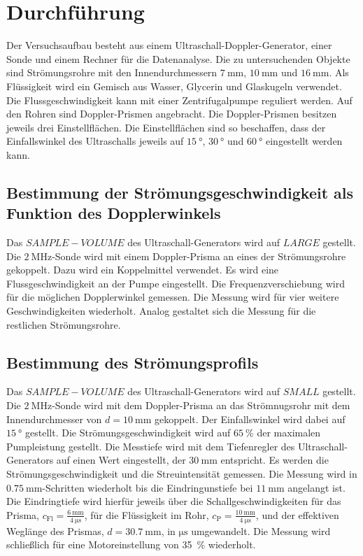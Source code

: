 \section{Durchführung}
\label{sec:Durchführung}
Der Versuchsaufbau besteht aus einem Ultraschall-Doppler-Generator, einer Sonde und einem Rechner für die Datenanalyse.
Die zu untersuchenden Objekte sind Strömungsrohre mit den Innendurchmessern $\SI{7}{\milli\meter}$, $\SI{10}{\milli\meter}$ und $\SI{16}{\milli\meter}$.
Als Flüssigkeit wird ein Gemisch aus Wasser, Glycerin und Glaskugeln verwendet.
Die Flussgeschwindigkeit kann mit einer Zentrifugalpumpe reguliert werden.
Auf den Rohren sind Doppler-Prismen angebracht.
Die Doppler-Prismen besitzen jeweils drei Einstellflächen.
Die Einstellflächen sind so beschaffen, dass der Einfallswinkel des Ultraschalls jeweils auf $\SI{15}{\degree}$, $\SI{30}{\degree}$ und $\SI{60}{\degree}$ eingestellt werden kann.
\subsection{Bestimmung der Strömungsgeschwindigkeit als Funktion des Dopplerwinkels}
Das $SAMPLE-VOLUME$ des Ultraschall-Generators wird auf $LARGE$ gestellt.
Die $\SI{2}{\mega\hertz}$-Sonde wird mit einem Doppler-Prisma an eines der Strömungsrohre gekoppelt.
Dazu wird ein Koppelmittel verwendet.
Es wird eine Flussgeschwindigkeit an der Pumpe eingestellt.
Die Frequenzverschiebung wird für die möglichen Dopplerwinkel gemessen.
Die Messung wird für vier weitere Geschwindigkeiten wiederholt.
Analog gestaltet sich die Messung für die restlichen Strömungsrohre.
\subsection{Bestimmung des Strömungsprofils}
Das $SAMPLE-VOLUME$ des Ultraschall-Generators wird auf $SMALL$ gestellt.
Die $\SI{2}{\mega\hertz}$-Sonde wird mit dem Doppler-Prisma an das Strömnugsrohr mit dem Innendurchmesser von $d= \SI{10}{\milli\meter}$ gekoppelt.
Der Einfallswinkel wird dabei auf $\SI{15}{\degree}$ gestellt.
Die Strömungsgeschwindigkeit wird auf $\SI{65}{\percent}$ der maximalen Pumpleistung gestellt.
Die Messtiefe wird mit dem Tiefenregler des Ultraschall-Generators auf einen Wert eingestellt, der $\SI{30}{\milli\meter}$ entspricht.
Es werden die Strömungsgeschwindigkeit und die Streuintensität gemessen.
Die Messung wird in $\SI{0.75}{\milli\meter}$-Schritten wiederholt bis die Eindringunstiefe bei $\SI{11}{\milli\meter}$ angelangt ist.
Die Eindringtiefe wird hierfür jeweils über die Schallgeschwindigkeiten für das Prisma,
$c_\text{Fl}=\frac{\SI{6}{\milli\meter}}{\SI{4}{\micro\second}}$\cite{us3}, für die Flüssigkeit im Rohr,
$c_\text{P}=\frac{\SI{10}{\milli\meter}}{\SI{4}{\micro\second}}$\cite{us3}, und der effektiven Weglänge des Prismas, $d=\SI{30.7}{\milli\meter}$\cite{us3},
in $\si{\micro\second}$ umgewandelt.
Die Messung wird schließlich für eine Motoreinstellung von \SI{35}{\percent} wiederholt.
